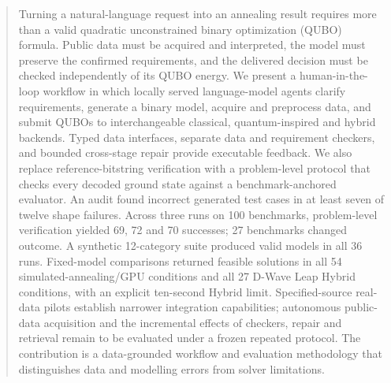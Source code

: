 \begin{abstract}
Turning a natural-language request into an annealing result requires more than a valid quadratic unconstrained
binary optimization (QUBO) formula. Public data must be acquired and interpreted, the model must preserve the
confirmed requirements, and the delivered decision must be checked independently of its QUBO energy.
We present a human-in-the-loop workflow in which locally served language-model agents clarify requirements,
generate a binary model, acquire and preprocess data, and submit QUBOs to interchangeable classical,
quantum-inspired and hybrid backends. Typed data interfaces, separate data and requirement checkers, and bounded
cross-stage repair provide executable feedback. We also replace reference-bitstring verification with a
problem-level protocol that checks every decoded ground state against a benchmark-anchored evaluator.
An audit found incorrect generated test cases in at least seven of twelve shape failures. Across three runs on
100 benchmarks, problem-level verification yielded 69, 72 and 70 successes; 27 benchmarks changed outcome.
A synthetic 12-category suite produced valid models in all 36 runs. Fixed-model comparisons returned feasible
solutions in all 54 simulated-annealing/GPU conditions and all 27 D-Wave Leap Hybrid conditions, with an explicit
ten-second Hybrid limit. Specified-source real-data pilots establish narrower integration capabilities;
autonomous public-data acquisition and the incremental effects of checkers, repair and retrieval remain to be
evaluated under a frozen repeated protocol. The contribution is a data-grounded workflow and evaluation methodology that distinguishes data and modelling
errors from solver limitations.
\end{abstract}
